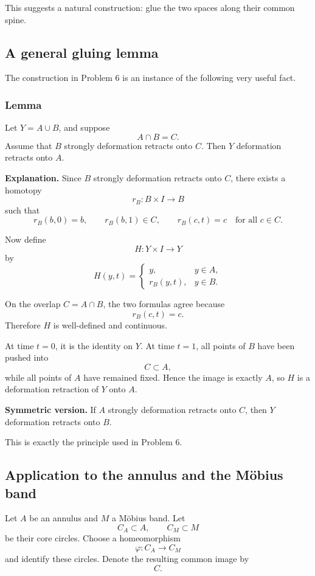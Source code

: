 \documentclass[12pt,a4paper]{article}
\theoremstyle{notespace}
\begin{document}
This suggests a natural construction: glue the two spaces along their common spine.

\subsection{A general gluing lemma}

The construction in Problem 6 is an instance of the following very useful fact.

\subsubsection{Lemma}

Let \(Y=A\cup B\), and suppose
\[
A\cap B=C.
\]
Assume that \(B\) strongly deformation retracts onto \(C\). Then \(Y\) deformation retracts onto \(A\).

\medskip

\textbf{Explanation.}
Since \(B\) strongly deformation retracts onto \(C\), there exists a homotopy
\[
r_B:B\times I\to B
\]
such that
\[
r_B(b,0)=b,
\qquad
r_B(b,1)\in C,
\qquad
r_B(c,t)=c
\quad\text{for all }c\in C.
\]

Now define
\[
H:Y\times I\to Y
\]
by
\[
H(y,t)=
\begin{cases}
	y,& y\in A,\\[4pt]
	r_B(y,t),& y\in B.
\end{cases}
\]

On the overlap \(C=A\cap B\), the two formulas agree because
\[
r_B(c,t)=c.
\]
Therefore \(H\) is well-defined and continuous.

At time \(t=0\), it is the identity on \(Y\). At time \(t=1\), all points of \(B\) have been pushed into
\[
C\subset A,
\]
while all points of \(A\) have remained fixed. Hence the image is exactly \(A\), so \(H\) is a deformation retraction of \(Y\) onto \(A\).

\medskip

\textbf{Symmetric version.}
If \(A\) strongly deformation retracts onto \(C\), then \(Y\) deformation retracts onto \(B\).

\medskip

This is exactly the principle used in Problem 6.

\subsection{Application to the annulus and the Möbius band}

Let \(A\) be an annulus and \(M\) a Möbius band. Let
\[
C_A\subset A,
\qquad
C_M\subset M
\]
be their core circles. Choose a homeomorphism
\[
\varphi:C_A\to C_M
\]
and identify these circles. Denote the resulting common image by
\[
C.
\]
\end{document}
